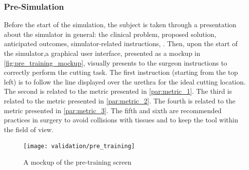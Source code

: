 \subsubsection{Pre-Simulation}
Before the start of the simulation, the subject is taken through a presentation about the simulator in general: the clinical problem, proposed solution, anticipated outcomes, simulator-related instructions, \etc. Then, upon the start of the simulator,a graphical user interface, presented as a mockup in \autoref{fig:pre_training_mockup}, visually presents to the surgeon instructions to correctly perform the cutting task. The first instruction (starting from the top left) is to follow the line displayed over the urethra for the ideal cutting location. The second is related to the metric presented in \autoref{par:metric_1}. The third is related to the metric presented in \autoref{par:metric_2}. The fourth is related to the metric presented in \autoref{par:metric_3}. The fifth and sixth are recommended practices in surgery to avoid collisions with tissues and to keep the tool within the field of view.
\begin{figure}
  \centering%
  \texttt{[image: validation/pre\_training]}
  \caption{A mockup of the pre-training screen}
  \label{fig:pre_training_mockup}
\end{figure}

